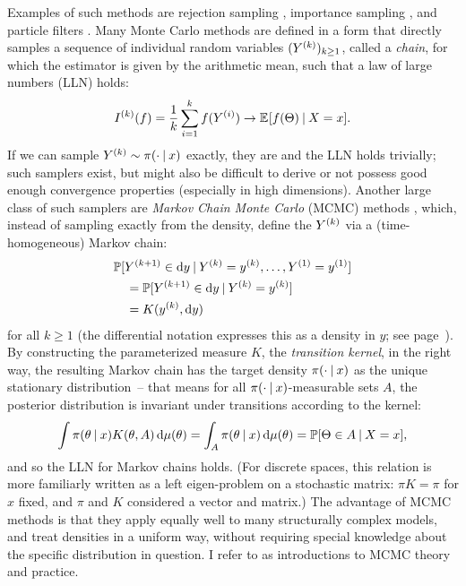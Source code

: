 Examples of such methods are rejection sampling \parencites[chapter
II.3]{devroye1986nonuniform}[section 4]{vihola2020lectures}, importance sampling \parencite[section
4]{vihola2020lectures}, and particle filters \parencite{dahlin2015getting}.  Many Monte Carlo
methods are defined in a form that directly samples a sequence of individual random variables
\((Y^{(k)})_{k \ge 1}\), called a \emph{chain}, for which the estimator is given by the arithmetic
mean, such that a law of large numbers (LLN) holds:
\begin{equation}
  \label{eq:mc-lln}
  \kth{I}(f) = \frac{1}{k} \sum_{i=1}^{k} f(\kth[i]{Y}) \to \Exp{f(\Theta) \given X = x}.
\end{equation}
If we can sample \(Y^{(k)} \sim \pi(\cdot \:\vert\: x)\) exactly, they are \iid{} and the LLN holds
trivially; such samplers exist, but might also be difficult to derive or not possess good enough
convergence properties (especially in high dimensions).  Another large class of such samplers are
\emph{Markov Chain Monte Carlo} (MCMC) methods \parencite{vihola2020lectures,robert1999monte},
which, instead of sampling exactly from the density, define the \(Y^{(k)}\) via a (time-homogeneous)
Markov chain:
\begin{equation}
  \label{eq:mc-kernel}
  \begin{aligned}
    &\Prob{\kth[k+1]{Y} \in \dif y
      \given \kth{Y} = \kth{y}, \ldots, \kth[1]{Y} = \kth[1]{y}} \\
    &\quad = \Prob{\kth[k+1]{Y} \in \dif y \given \kth{Y} = \kth{y}}  \\
    &\quad = K(\kth{y}, \dif y) \\
  \end{aligned}
\end{equation}
for all \(k \ge 1\) (the differential notation expresses this as a density in \(y\); see
page~\pageref{cha:notation}).  By constructing the parameterized measure \(K\), the \emph{transition
  kernel}, in the right way, the resulting Markov chain has the target density
\(\pi(\cdot \:\vert\: x)\) as the unique stationary distribution~-- that means for all
\(\pi(\cdot \:\vert\: x)\)-measurable sets \(A\), the posterior distribution is invariant under
transitions according to the kernel:
\begin{equation}
  \label{eq:stationarity}
  \int \pi(\theta \given x) K(\theta, A) \dif\mu(\theta) = \int_A \pi(\theta \given x) \dif\mu(\theta) =
  \Prob{\Theta \in A \given X = x},
\end{equation}
and so the LLN for Markov chains holds.  (For discrete spaces, this relation is more familiarly
written as a left eigen-problem on a stochastic matrix: \(\pi K = \pi\) for \(x\) fixed, and \(\pi\)
and \(K\) considered a vector and matrix.)  The advantage of MCMC methods is that they apply equally
well to many structurally complex models, and treat densities in a uniform way, without requiring
special knowledge about the specific distribution in question.  I refer to \textcites[chapter
6]{vihola2020lectures}{robert1999monte}[chapters 24 and following]{murphy2012machine} as
introductions to MCMC theory and practice.

